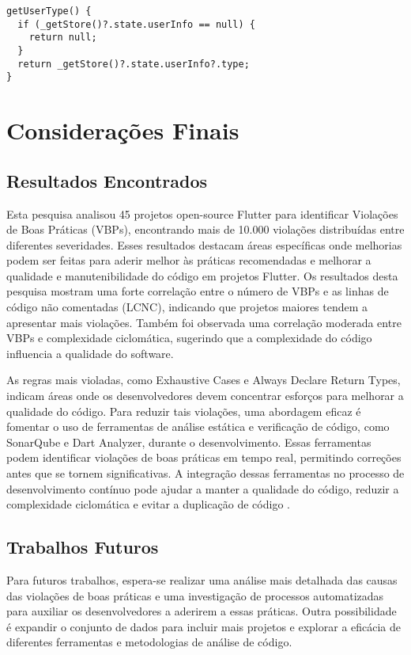 \documentclass[12pt]{article}
\begin{document}
\begin{tcolorbox}[codeSnippetStyle={gsy\_github\_app\_flutter/lib/page/my\_page.dart}]
\begin{verbatim}
getUserType() {
  if (_getStore()?.state.userInfo == null) {
    return null;
  }
  return _getStore()?.state.userInfo?.type;
}
\end{verbatim}
\end{tcolorbox}

\section{Considerações Finais}
\subsection{Resultados Encontrados}
Esta pesquisa analisou 45 projetos open-source Flutter para identificar Violações de Boas Práticas (VBPs), encontrando mais de 10.000 violações distribuídas entre diferentes severidades. Esses resultados destacam áreas específicas onde melhorias podem ser feitas para aderir melhor às práticas recomendadas e melhorar a qualidade e manutenibilidade do código em projetos Flutter. Os resultados desta pesquisa mostram uma forte correlação entre o número de VBPs e as linhas de código não comentadas (LCNC), indicando que projetos maiores tendem a apresentar mais violações. Também foi observada uma correlação moderada entre VBPs e complexidade ciclomática, sugerindo que a complexidade do código influencia a qualidade do software.

As regras mais violadas, como Exhaustive Cases e Always Declare Return Types, indicam áreas onde os desenvolvedores devem concentrar esforços para melhorar a qualidade do código. %
Para reduzir tais violações, uma abordagem eficaz é fomentar o uso de ferramentas de análise estática e verificação de código, como SonarQube e Dart Analyzer, durante o desenvolvimento.  Essas ferramentas podem identificar violações de boas práticas em tempo real, permitindo correções antes que se tornem significativas. A integração dessas ferramentas no processo de desenvolvimento contínuo pode ajudar a manter a qualidade do código, reduzir a complexidade ciclomática e evitar a duplicação de código \cite{kalagara2023measuring}.

\subsection{Trabalhos Futuros}
Para futuros trabalhos, espera-se realizar uma análise mais detalhada das causas das violações de boas práticas e uma investigação de processos automatizadas para auxiliar os desenvolvedores a aderirem a essas práticas. Outra possibilidade é expandir o conjunto de dados para incluir mais projetos e explorar a eficácia de diferentes ferramentas e metodologias de análise de código.



\end{document}
